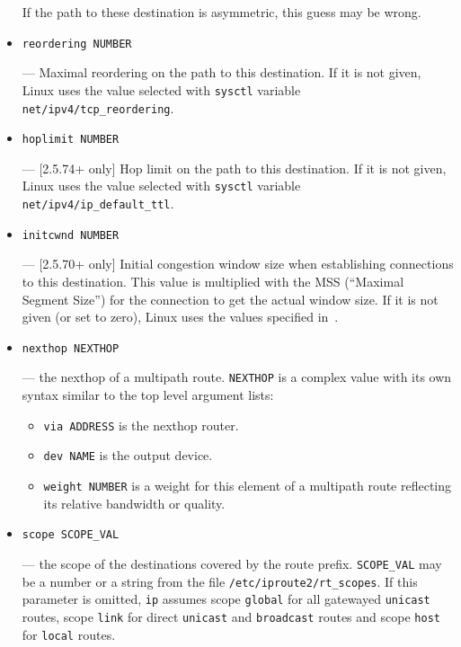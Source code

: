 \begin{itemize}
\begin{NB}
  If the path to these destination is asymmetric, this guess may be wrong.
\end{NB}

\item \verb|reordering NUMBER|

--- \threeonly Maximal reordering on the path to this destination.
    If it is not given, Linux uses the value selected with \verb|sysctl|
    variable \verb|net/ipv4/tcp_reordering|.

\item \verb|hoplimit NUMBER|

--- [2.5.74+ only] Hop limit on the path to this destination. If it is not
    given, Linux uses the value selected with \verb|sysctl| variable
    \verb|net/ipv4/ip_default_ttl|.

\item \verb|initcwnd NUMBER|

--- [2.5.70+ only] Initial congestion window size when establishing
    connections to this destination. This value is multiplied with the
    MSS (``Maximal Segment Size'') for the connection to get the actual
    window size. If it is not given (or set to zero), Linux uses the
    values specified in~\cite{RFC2414}.


\item \verb|nexthop NEXTHOP|

--- the nexthop of a multipath route. \verb|NEXTHOP| is a complex value
with its own syntax similar to the top level argument lists:
\begin{itemize}
\item \verb|via ADDRESS| is the nexthop router.
\item \verb|dev NAME| is the output device.
\item \verb|weight NUMBER| is a weight for this element of a multipath
route reflecting its relative bandwidth or quality.
\end{itemize}

\item \verb|scope SCOPE_VAL|

--- the scope of the destinations covered by the route prefix.
\verb|SCOPE_VAL| may be a number or a string from the file
\verb|/etc/iproute2/rt_scopes|.
If this parameter is omitted,
\verb|ip| assumes scope \verb|global| for all gatewayed \verb|unicast|
routes, scope \verb|link| for direct \verb|unicast| and \verb|broadcast| routes
and scope \verb|host| for \verb|local| routes.


\end{itemize}
